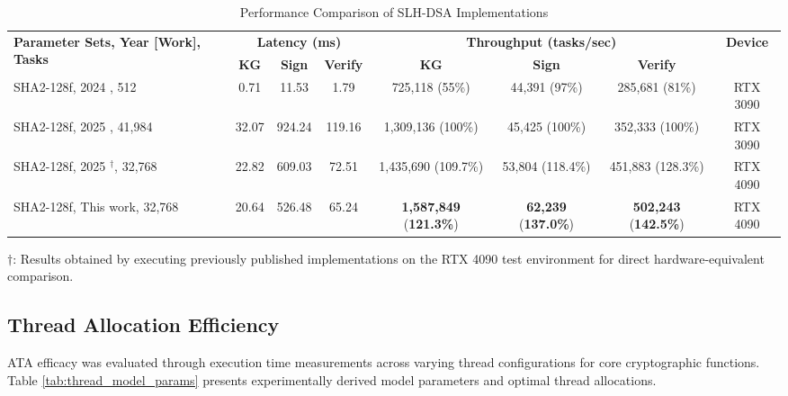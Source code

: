 \documentclass[journal]{IEEEtran}
\begin{document}
\begin{table*}[htpb]
  \centering
  \caption{Performance Comparison of SLH-DSA Implementations}
  \label{tab:comparative_perf}
  \begin{tabular}{@{}lccccccc@{}}
    \toprule
    \multirow{2}{*}{\textbf{Parameter Sets, Year [Work], Tasks}} & \multicolumn{3}{c}{\textbf{Latency (ms)}} & \multicolumn{3}{c}{\textbf{Throughput (tasks/sec)}} & \multirow{2}{*}{\textbf{Device}} \\
    \cmidrule(lr){2-4} \cmidrule(lr){5-7}
    & \textbf{KG} & \textbf{Sign} & \textbf{Verify} & \textbf{KG} & \textbf{Sign} & \textbf{Verify} & \\
    \midrule
    SHA2-128f, 2024 \cite{Kim2024}, 512  & 0.71 & 11.53 & 1.79 & 725,118 (55\%) & 44,391 (97\%) & 285,681 (81\%) & RTX 3090 \\
    SHA2-128f, 2025 \cite{Wang2025}, 41,984 & 32.07 & 924.24 & 119.16 & 1,309,136 (100\%) & 45,425 (100\%) & 352,333 (100\%) & RTX 3090 \\
    SHA2-128f, 2025 \cite{Wang2025}$^\dagger$, 32,768 & 22.82 & 609.03 & 72.51 & 1,435,690 (109.7\%) & 53,804 (118.4\%) & 451,883 (128.3\%) & RTX 4090 \\
    SHA2-128f, This work, 32,768 & 20.64 & 526.48 & 65.24 & \textbf{1,587,849} (\textbf{121.3\%}) & \textbf{62,239} (\textbf{137.0\%}) & \textbf{502,243} (\textbf{142.5\%}) & RTX 4090 \\
    \bottomrule
  \end{tabular}
  \begin{tablenotes}
  \item[] $\dagger$: Results obtained by executing previously published implementations on the RTX 4090 test environment for direct hardware-equivalent comparison.
  \end{tablenotes}
\end{table*}

\subsection{Thread Allocation Efficiency}

ATA efficacy was evaluated through execution time measurements across varying thread configurations for core cryptographic functions. Table \ref{tab:thread_model_params} presents experimentally derived model parameters and optimal thread allocations.
\end{document}
